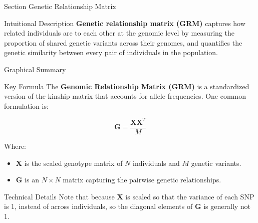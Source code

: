 
\begin{frame}{Section}
\centering
\Huge{Genetic Relationship Matrix}
\end{frame}


\begin{frame}{Intuitional Description}
\textbf{Genetic relationship matrix (GRM)} captures how related individuals are to each other at the genomic level by measuring the proportion of shared genetic variants across their genomes, and quantifies the genetic similarity between every pair of individuals in the population.
\end{frame}

\begin{frame}{Graphical Summary}

\end{frame}


\begin{frame}{Key Formula}
The \textbf{Genomic Relationship Matrix (GRM)} is a standardized version of the kinship matrix that accounts for allele frequencies. One common formulation is:

$$
\mathbf{G} = \frac{ \mathbf{X} \mathbf{X}^T}{M}
$$

Where:
\begin{itemize}
\item $\mathbf{X}$ is the scaled genotype matrix of $N$ individuals and $M$ genetic variants.
\item $ \mathbf{G} $ is an $ N \times N $ matrix capturing the pairwise genetic relationships.
\end{itemize}

\end{frame}


\begin{frame}{Technical Details}
Note that because $\mathbf{X}$ is scaled so that the variance of each SNP is 1, instead of across individuals, so the diagonal elements of $\mathbf{G}$ is generally not 1.
\end{frame}

